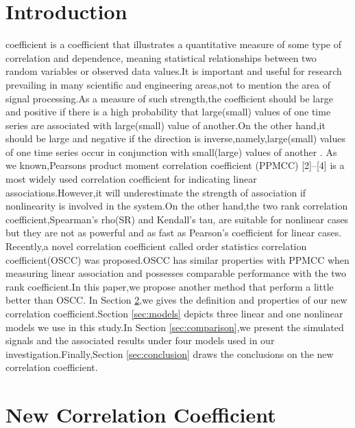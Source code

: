 \documentclass[journal]{IEEEtran}
\begin{document}
\section{Introduction}
     coefficient is a coefficient that illustrates a quantitative measure of some type of correlation and dependence, meaning statistical relationships between two
    random variables or observed data values.It is important and
    useful for research prevailing in many scientific and engineering
    areas,not to mention the area of signal processing.As a
    measure of such strength,the coefficient should be large and
    positive if there is a high probability that large(small) values
    of one time series are associated with large(small) value of
    another.On the other hand,it should be large and negative if
    the direction is inverse,namely,large(small) values of one time
    series occur in conjunction with small(large) values of another
    .
    As we known,Pearsons product moment correlation coefficient
    (PPMCC) [2]–[4] is a most widely used correlation
    coefficient for indicating linear associations.However,it will
    underestimate the strength of association if nonlinearity is
    involved in the system.On the other hand,the two rank correlation
    coefficient,Spearman’s rho(SR) and Kendall’s tau, are
    suitable for nonlinear cases but they are not as powerful and
    as fast as Pearson’s coefficient for linear cases. Recently,a
    novel correlation coefficient called order statistics correlation
    coefficient(OSCC) was proposed.OSCC has similar properties
    with PPMCC when measuring linear association and possesses
    comparable performance with the two rank coefficient.In this
    paper,we propose another method that perform a little better
    than OSCC.
    In Section \ref{sec:new cc},we gives the definition and properties of our
    new correlation coefficient.Section \ref{sec:models} depicts three linear and
    one nonlinear models we use in this study.In Section \ref{sec:comparison},we
    present the simulated signals and the associated results under
    four models used in our investigation.Finally,Section \ref{sec:conclusion} draws
    the conclusions on the new correlation coefficient.



\section{New Correlation Coefficient}\label{sec:new cc}
\end{document}
